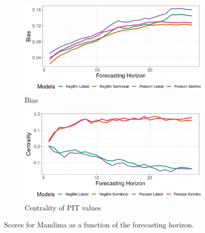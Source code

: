 \begin{figure}[H]
\begin{subfigure}{0.5\textwidth}
  \centering
  \includegraphics[width=\linewidth]{../output/Mandima_bias.png}  
  \caption{Bias}
  \label{fig:Mandima_scores_3}
\end{subfigure}
\begin{subfigure}{0.5\textwidth}
  \centering
  \includegraphics[width=\linewidth]{../output/Mandima_centrality.png}  
  \caption{Centrality of PIT values}
  \label{fig:Mandima_scores_4}
\end{subfigure}
  \caption{Scores for Mandima as a function of the forecasting horizon.}

  \label{fig:nat_scores}
\end{figure}
